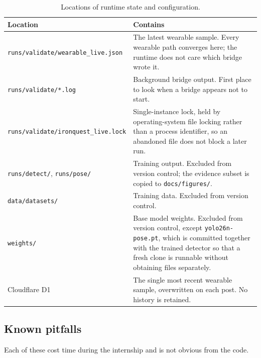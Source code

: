\documentclass[11pt,a4paper]{article}
\newcommand{\code}[1]{\texttt{\small #1}}
\begin{document}
\begin{table}[H]
\centering
\small
\caption{Locations of runtime state and configuration.}
\begin{tabularx}{\textwidth}{@{}L{6.5cm} Y@{}}
\toprule
\textbf{Location} & \textbf{Contains} \\
\midrule
\code{runs/validate/wearable\_live.json} & The latest wearable sample. Every wearable path converges here; the runtime does not care which bridge wrote it. \\
\code{runs/validate/*.log} & Background bridge output. First place to look when a bridge appears not to start. \\
\code{runs/validate/ironquest\_live.lock} & Single-instance lock, held by operating-system file locking rather than a process identifier, so an abandoned file does not block a later run. \\
\code{runs/detect/}, \code{runs/pose/} & Training output. Excluded from version control; the evidence subset is copied to \code{docs/figures/}. \\
\code{data/datasets/} & Training data. Excluded from version control. \\
\code{weights/} & Base model weights. Excluded from version control, except \code{yolo26n-pose.pt}, which is committed together with the trained detector so that a fresh clone is runnable without obtaining files separately. \\
Cloudflare D1 & The single most recent wearable sample, overwritten on each post. No history is retained. \\
\bottomrule
\end{tabularx}
\end{table}

\subsection{Known pitfalls}

Each of these cost time during the internship and is not obvious from the code.
\end{document}
